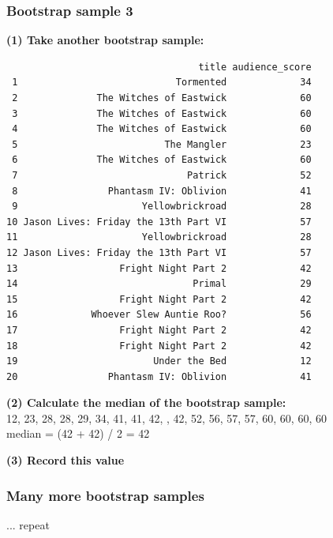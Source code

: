 \documentclass[slidestop,compress,mathserif,12pt,t,professionalfonts,xcolor=table]{beamer}
\begin{document}
\begin{frame}[fragile]
\frametitle{Bootstrap sample 3}

{\small \textbf{(1) Take another bootstrap sample:}}
\pause
{\tiny
\begin{verbatim}
                                  title audience_score
 1                            Tormented             34
 2              The Witches of Eastwick             60
 3              The Witches of Eastwick             60
 4              The Witches of Eastwick             60
 5                          The Mangler             23
 6              The Witches of Eastwick             60
 7                              Patrick             52
 8                Phantasm IV: Oblivion             41
 9                      Yellowbrickroad             28
10 Jason Lives: Friday the 13th Part VI             57
11                      Yellowbrickroad             28
12 Jason Lives: Friday the 13th Part VI             57
13                  Fright Night Part 2             42
14                               Primal             29
15                  Fright Night Part 2             42
16             Whoever Slew Auntie Roo?             56
17                  Fright Night Part 2             42
18                  Fright Night Part 2             42
19                        Under the Bed             12
20                Phantasm IV: Oblivion             41
\end{verbatim}
}

\pause

{\small \textbf{(2) Calculate the median of the bootstrap sample:}} \\
\pause
{\footnotesize
12, 23, 28, 28, 29, 34, 41, 41, 42, , 42, 52, 56, 57, 57, 60, 60, 60, 60 \\
median = (42 + 42) / 2 = 42 \\
}

\pause

{\small
\textbf{(3) Record this value}
}

\end{frame}


\begin{frame}
\frametitle{Many more bootstrap samples}

\vfill

... repeat

\vfill

\end{frame}
\end{document}
